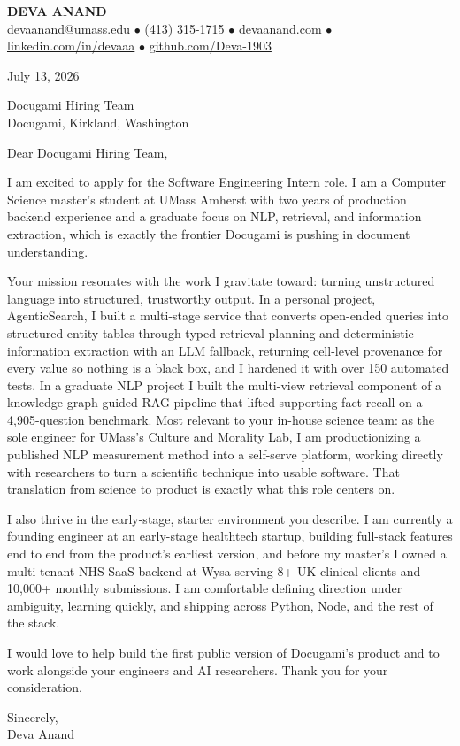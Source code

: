 \documentclass[letterpaper,11pt]{article}
\begin{document}
\begin{center}
    {\fontsize{18}{20}\selectfont\bfseries DEVA ANAND}\\ \vspace{3pt}
    {\small
    \href{mailto:devaanand@umass.edu}{devaanand@umass.edu}
    \enspace$\bullet$\enspace
    (413) 315-1715
    \enspace$\bullet$\enspace
    \href{https://devaanand.com}{devaanand.com}
    \enspace$\bullet$\enspace
    \href{https://linkedin.com/in/devaaa/}{linkedin.com/in/devaaa}
    \enspace$\bullet$\enspace
    \href{https://github.com/Deva-1903}{github.com/Deva-1903}}
\end{center}
\vspace{6pt}

July 13, 2026
\vspace{2pt}

Docugami Hiring Team \\
Docugami, Kirkland, Washington

\vspace{4pt}

Dear Docugami Hiring Team,

I am excited to apply for the Software Engineering Intern role. I am a Computer Science master's student at UMass Amherst with two years of production backend experience and a graduate focus on NLP, retrieval, and information extraction, which is exactly the frontier Docugami is pushing in document understanding.

Your mission resonates with the work I gravitate toward: turning unstructured language into structured, trustworthy output. In a personal project, AgenticSearch, I built a multi-stage service that converts open-ended queries into structured entity tables through typed retrieval planning and deterministic information extraction with an LLM fallback, returning cell-level provenance for every value so nothing is a black box, and I hardened it with over 150 automated tests. In a graduate NLP project I built the multi-view retrieval component of a knowledge-graph-guided RAG pipeline that lifted supporting-fact recall on a 4,905-question benchmark. Most relevant to your in-house science team: as the sole engineer for UMass's Culture and Morality Lab, I am productionizing a published NLP measurement method into a self-serve platform, working directly with researchers to turn a scientific technique into usable software. That translation from science to product is exactly what this role centers on.

I also thrive in the early-stage, starter environment you describe. I am currently a founding engineer at an early-stage healthtech startup, building full-stack features end to end from the product's earliest version, and before my master's I owned a multi-tenant NHS SaaS backend at Wysa serving 8+ UK clinical clients and 10,000+ monthly submissions. I am comfortable defining direction under ambiguity, learning quickly, and shipping across Python, Node, and the rest of the stack.

I would love to help build the first public version of Docugami's product and to work alongside your engineers and AI researchers. Thank you for your consideration.

\vspace{6pt}

Sincerely, \\
Deva Anand
\end{document}
